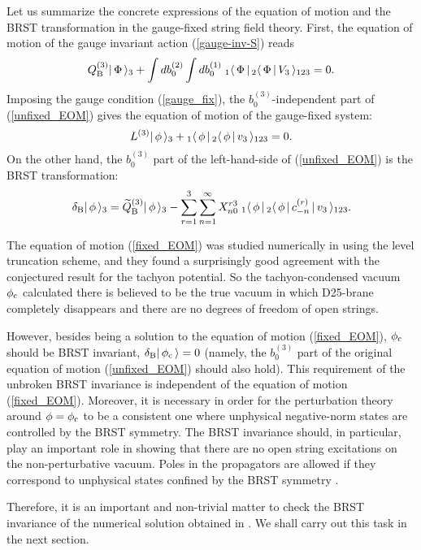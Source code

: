 \documentclass[a4paper,12pt]{article}
\begin{document}
Let us summarize the concrete expressions of the equation of motion
and the BRST transformation in the gauge-fixed string field theory.
First, the equation of motion of the gauge invariant action
(\ref{gauge-inv-S}) reads
\begin{equation}
  \label{unfixed_EOM}
  Q_{\text B}^{(3)} |\, \Phi\, \rangle_{3} + \int db_0^{(2)} \int db_0^{(1)}\;
       {}_1\langle \, \Phi \,|\,{}_2\langle \, \Phi \,|\, V_3\, \rangle_{123} =0.
\end{equation}
Imposing the gauge condition (\ref{gauge_fix}), the
$b_0^{(3)}$-independent part of (\ref{unfixed_EOM}) gives the equation
of motion of the gauge-fixed system:
\begin{equation}
  \label{fixed_EOM}
  L^{(3)}|\, \phi\, \rangle_{3} + {}_1\langle \, \phi \,|\,{}_2\langle \, \phi \,|\, v_3\, \rangle_{123} = 0 .
\end{equation}
On the other hand, the $b_0^{(3)}$ part of the left-hand-side of
(\ref{unfixed_EOM}) is the BRST transformation:
\begin{equation}
  \delta_{\text B} |\, \phi\, \rangle_{3} = \widetilde Q_{\text B}^{(3)} |\, \phi\, \rangle_{3} -
       \sum_{r=1}^{3}\sum_{n=1}^{\infty}
         X^{r3}_{n0} \; {}_1\langle \, \phi \,|\,{}_2\langle \, \phi \,|\, c_{-n}^{(r)} \,|\, v_3\, \rangle_{123}.
       \label{BRST_trf}
\end{equation}

The equation of motion (\ref{fixed_EOM}) was studied numerically in
\cite{SZ,Moeller:2000xv} using the level truncation scheme, and they
found a surprisingly good agreement with the conjectured result
\cite{Sen:1999mh} for the tachyon potential.  So the tachyon-condensed
vacuum $\phi_{\text c}$ calculated there is believed to be the
true vacuum in which D25-brane completely disappears and there are no
degrees of freedom of open strings.

However, besides being a solution to the equation of motion
(\ref{fixed_EOM}), $\phi_{\text c}$ should be BRST invariant,
$\delta_{\text B} |\, \phi_{\text c}\, \rangle=0$ (namely, the $b_0^{(3)}$ part of the
original equation of motion (\ref{unfixed_EOM}) should also hold).
This requirement of the unbroken BRST invariance is independent of the
equation of motion (\ref{fixed_EOM}).
Moreover, it is necessary in order for the
perturbation theory around $\phi=\phi_{\text c}$ to be a consistent
one where unphysical negative-norm states are controlled by the BRST
symmetry. The BRST invariance should, in particular, play an important
role in showing
that there are no open string excitations on the non-perturbative
vacuum. Poles in the propagators are allowed if they correspond to
unphysical states confined by the BRST symmetry \cite{Kugo:1979gm}.

Therefore, it is an important and non-trivial matter to check the BRST
invariance of the numerical solution obtained in
\cite{SZ,Moeller:2000xv}. We shall carry out this task in the next
section.
\end{document}
